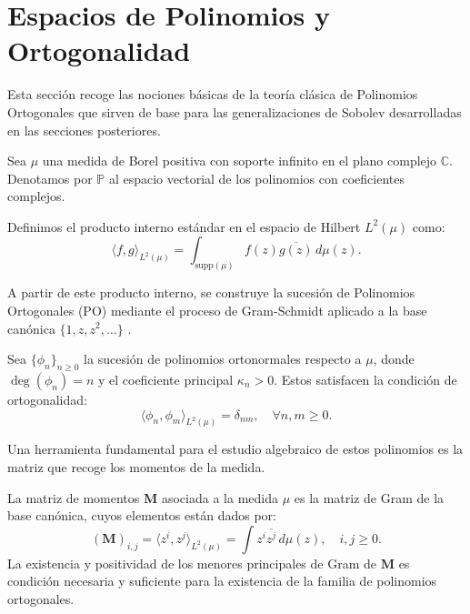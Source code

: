 \section{Espacios de Polinomios y Ortogonalidad}

Esta sección recoge las nociones básicas de la teoría clásica de Polinomios Ortogonales que sirven de base para las generalizaciones de Sobolev desarrolladas en las secciones posteriores.

Sea $\mu$ una medida de Borel positiva con soporte infinito en el plano complejo $\mathbb{C}$. Denotamos por $\mathbb{P}$ al espacio vectorial de los polinomios con coeficientes complejos.

\begin{defn} \label{def:producto_estandar}
	Definimos el producto interno estándar en el espacio de Hilbert $L^2(\mu)$ como:
	\begin{equation}
		\langle f, g \rangle_{L^2(\mu)} = \int_{\text{supp}(\mu)} f(z) \overline{g(z)} \, d\mu(z).
	\end{equation}
\end{defn}

A partir de este producto interno, se construye la sucesión de Polinomios Ortogonales (PO) mediante el proceso de Gram-Schmidt aplicado a la base canónica $\{1, z, z^2, \dots\}$ \cite{szego1975orthogonal}.

\begin{defn} \label{def:polinomios_ortonormales}
	Sea $\{\phi_n\}_{n \geq 0}$ la sucesión de polinomios ortonormales respecto a $\mu$, donde $\deg(\phi_n) = n$ y el coeficiente principal $\kappa_n > 0$. Estos satisfacen la condición de ortogonalidad:
	\begin{equation}
		\langle \phi_n, \phi_m \rangle_{L^2(\mu)} = \delta_{nm}, \quad \forall n,m \geq 0.
	\end{equation}
\end{defn}

Una herramienta fundamental para el estudio algebraico de estos polinomios es la matriz que recoge los momentos de la medida.

\begin{defn} \label{def:matriz_momentos}
	La matriz de momentos $\mathbf{M}$ asociada a la medida $\mu$ es la matriz de Gram de la base canónica, cuyos elementos están dados por:
	\begin{equation}
		(\mathbf{M})_{i,j} = \langle z^i, z^j \rangle_{L^2(\mu)} = \int z^i \overline{z^j} \, d\mu(z), \quad i,j \geq 0.
	\end{equation}
	La existencia y positividad de los menores principales de Gram de $\mathbf{M}$ es condición necesaria y suficiente para la existencia de la familia de polinomios ortogonales.
\end{defn}


